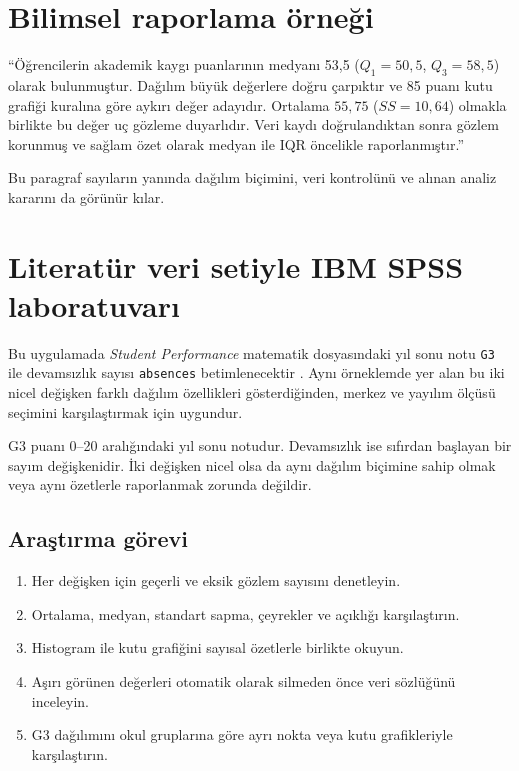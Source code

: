 \section{Bilimsel raporlama örneği}

``Öğrencilerin akademik kaygı puanlarının medyanı 53{,}5
($Q_1=50{,}5$, $Q_3=58{,}5$) olarak bulunmuştur. Dağılım büyük değerlere doğru
çarpıktır ve 85 puanı kutu grafiği kuralına göre aykırı değer adayıdır.
Ortalama $55{,}75$ ($SS=10{,}64$) olmakla birlikte bu değer uç gözleme
duyarlıdır. Veri kaydı doğrulandıktan sonra gözlem korunmuş ve sağlam özet
olarak medyan ile IQR öncelikle raporlanmıştır.''

Bu paragraf sayıların yanında dağılım biçimini, veri kontrolünü ve alınan
analiz kararını da görünür kılar.

\section{Literatür veri setiyle IBM SPSS laboratuvarı}

Bu uygulamada \emph{Student Performance} matematik dosyasındaki yıl sonu notu
\texttt{G3} ile devamsızlık sayısı \texttt{absences} betimlenecektir
\cite{cortez2008data,cortezsilva2008}. Aynı örneklemde yer alan bu iki nicel
değişken farklı dağılım özellikleri gösterdiğinden, merkez ve yayılım ölçüsü
seçimini karşılaştırmak için uygundur.

\begin{researchbox}
G3 puanı 0--20 aralığındaki yıl sonu notudur. Devamsızlık ise sıfırdan
başlayan bir sayım değişkenidir. İki değişken nicel olsa da aynı dağılım
biçimine sahip olmak veya aynı özetlerle raporlanmak zorunda değildir.
\end{researchbox}

\subsection{Araştırma görevi}

\begin{enumerate}
  \item Her değişken için geçerli ve eksik gözlem sayısını denetleyin.
  \item Ortalama, medyan, standart sapma, çeyrekler ve açıklığı karşılaştırın.
  \item Histogram ile kutu grafiğini sayısal özetlerle birlikte okuyun.
  \item Aşırı görünen değerleri otomatik olarak silmeden önce veri sözlüğünü inceleyin.
  \item G3 dağılımını okul gruplarına göre ayrı nokta veya kutu grafikleriyle karşılaştırın.
\end{enumerate}

